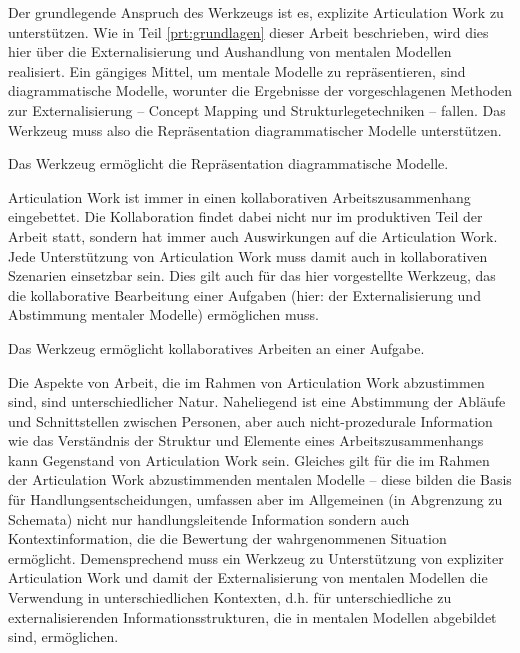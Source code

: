 Der grundlegende Anspruch des Werkzeugs ist es, explizite Articulation Work zu unterstützen. Wie in Teil \ref{prt:grundlagen} dieser Arbeit beschrieben, wird dies hier über die Externalisierung und Aushandlung von mentalen Modellen realisiert. Ein gängiges Mittel, um mentale Modelle zu repräsentieren, sind diagrammatische Modelle, worunter die Ergebnisse der vorgeschlagenen Methoden zur Externalisierung -- Concept Mapping und Strukturlegetechniken -- fallen. Das Werkzeug muss also die Repräsentation diagrammatischer Modelle unterstützen. 

\begin{hyp}
	\label{hyp:diagmodelle}
	Das Werkzeug ermöglicht die Repräsentation diagrammatische Modelle.
\end{hyp}

Articulation Work ist immer in einen kollaborativen Arbeitszusammenhang eingebettet. Die Kollaboration findet dabei nicht nur im produktiven Teil der Arbeit statt, sondern hat immer auch Auswirkungen auf die Articulation Work. Jede Unterstützung von Articulation Work muss damit auch in kollaborativen Szenarien einsetzbar sein. Dies gilt auch für das hier vorgestellte Werkzeug, das die kollaborative Bearbeitung einer Aufgaben (hier: der Externalisierung und Abstimmung mentaler Modelle) ermöglichen muss. 

\begin{hyp}
	\label{hyp:kollaborativ}
	Das Werkzeug ermöglicht kollaboratives Arbeiten an einer Aufgabe.
\end{hyp}

Die Aspekte von Arbeit, die im Rahmen von Articulation Work abzustimmen sind, sind unterschiedlicher Natur. Naheliegend ist eine Abstimmung der Abläufe und Schnittstellen zwischen Personen, aber auch nicht-prozedurale Information wie das Verständnis der Struktur und Elemente eines Arbeitszusammenhangs kann Gegenstand von Articulation Work sein. Gleiches gilt für die im Rahmen der Articulation Work abzustimmenden mentalen Modelle -- diese bilden die Basis für Handlungsentscheidungen, umfassen aber im Allgemeinen (in Abgrenzung zu Schemata) nicht nur handlungsleitende Information sondern auch Kontextinformation, die die Bewertung der wahrgenommenen Situation ermöglicht. Demensprechend muss ein Werkzeug zu Unterstützung von expliziter Articulation Work und damit der Externalisierung von mentalen Modellen die Verwendung in unterschiedlichen Kontexten, d.h. für unterschiedliche zu externalisierenden Informationsstrukturen, die in mentalen Modellen abgebildet sind, ermöglichen.

